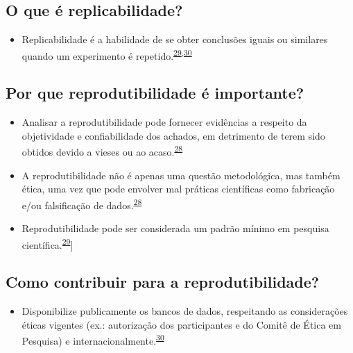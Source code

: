 \documentclass[
  a4paper,
]{book}
\providecommand{\tightlist}{%
  \setlength{\itemsep}{0pt}\setlength{\parskip}{0pt}}
\begin{document}
\hypertarget{o-que-uxe9-replicabilidade}{%
\subsection{O que é replicabilidade?}\label{o-que-uxe9-replicabilidade}}

\begin{itemize}
\tightlist
\item
  Replicabilidade é a habilidade de se obter conclusões iguais ou similares quando um experimento é repetido.\textsuperscript{\protect\hyperlink{ref-hofner2015}{29},\protect\hyperlink{ref-mair2016}{30}}
\end{itemize}

\hypertarget{por-que-reprodutibilidade-uxe9-importante}{%
\subsection{Por que reprodutibilidade é importante?}\label{por-que-reprodutibilidade-uxe9-importante}}

\begin{itemize}
\item
  Analisar a reprodutibilidade pode fornecer evidências a respeito da objetividade e confiabilidade dos achados, em detrimento de terem sido obtidos devido a vieses ou ao acaso.\textsuperscript{\protect\hyperlink{ref-resnik2016}{28}}
\item
  A reprodutibilidade não é apenas uma questão metodológica, mas também ética, uma vez que pode envolver mal práticas científicas como fabricação e/ou falsificação de dados.\textsuperscript{\protect\hyperlink{ref-resnik2016}{28}}
\item
  Reprodutibilidade pode ser considerada um padrão mínimo em pesquisa científica.\textsuperscript{\protect\hyperlink{ref-hofner2015}{29}}{]}
\end{itemize}

\hypertarget{como-contribuir-para-a-reprodutibilidade}{%
\subsection{Como contribuir para a reprodutibilidade?}\label{como-contribuir-para-a-reprodutibilidade}}

\begin{itemize}
\tightlist
\item
  Disponibilize publicamente os bancos de dados, respeitando as considerações éticas vigentes (ex.: autorização dos participantes e do Comitê de Ética em Pesquisa) e internacionalmente.\textsuperscript{\protect\hyperlink{ref-mair2016}{30}}
\end{itemize}
\end{document}

